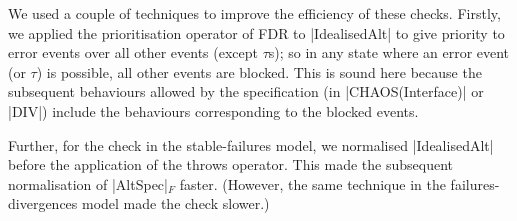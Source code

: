 We used a couple of techniques to improve the efficiency of these checks.
Firstly, we applied the prioritisation operator of FDR to |IdealisedAlt| to
give priority to error events over all other events (except $\tau$s); so in
any state where an error event (or $\tau$) is possible, all other events are
blocked.  This is sound here because the subsequent behaviours allowed by the
specification (in |CHAOS(Interface)| or |DIV|) include the behaviours
corresponding to the blocked events.

Further, for the check in the stable-failures model, we normalised
|IdealisedAlt| before the application of the throws operator.  This made the
subsequent normalisation of |AltSpec|$_F$ faster.  (However, the same
technique in the failures-divergences model made the check slower.)

